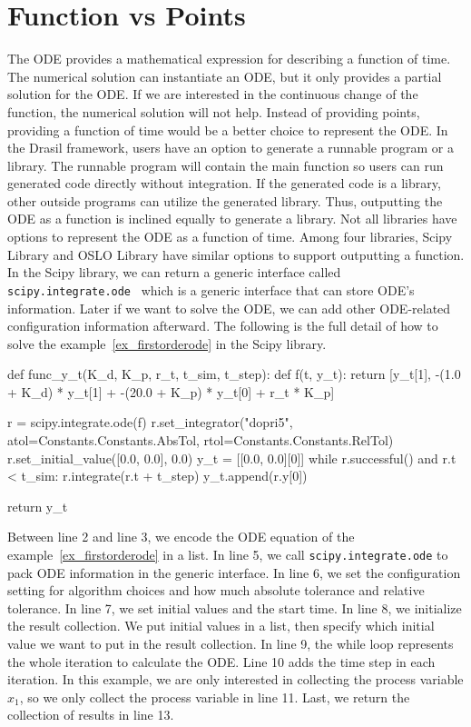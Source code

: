 \section{Function vs Points}
The ODE provides a mathematical expression for describing a function of time. The numerical solution can instantiate an ODE, but it only provides a partial solution for the ODE. If we are interested in the continuous change of the function, the numerical solution will not help. Instead of providing points, providing a function of time would be a better choice to represent the ODE. In the Drasil framework, users have an option to generate a runnable program or a library. The runnable program will contain the main function so users can run generated code directly without integration. If the generated code is a library, other outside programs can utilize the generated library. Thus, outputting the ODE as a function is inclined equally to generate a library. Not all libraries have options to represent the ODE as a function of time. Among four libraries, Scipy Library and OSLO Library have similar options to support outputting a function. In the Scipy library, we can return a generic interface called \verb|scipy.integrate.ode|~\citep{scipyfun} which is a generic interface that can store ODE's information. Later if we want to solve the ODE, we can add other ODE-related configuration information afterward. The following is the full detail of how to solve the example~\ref{ex_firstorderode} in the Scipy library.

\begin{listing}[ht]
\begin{python1}
def func_y_t(K_d, K_p, r_t, t_sim, t_step):
    def f(t, y_t):
        return [y_t[1], -(1.0 + K_d) * y_t[1] + -(20.0 + K_p) * y_t[0] + r_t * K_p]
    
    r = scipy.integrate.ode(f)
    r.set_integrator("dopri5", atol=Constants.Constants.AbsTol, rtol=Constants.Constants.RelTol)
    r.set_initial_value([0.0, 0.0], 0.0)
    y_t = [[0.0, 0.0][0]]
    while r.successful() and r.t < t_sim:
        r.integrate(r.t + t_step)
        y_t.append(r.y[0])
    
    return y_t
\end{python1}
\label{code_pythonscipy}
\end{listing}

Between line 2 and line 3, we encode the ODE equation of the example~\ref{ex_firstorderode} in a list. In line 5, we call \verb|scipy.integrate.ode| to pack ODE information in the generic interface. In line 6, we set the configuration setting for algorithm choices and how much absolute tolerance and relative tolerance. In line 7, we set initial values and the start time. In line 8, we initialize the result collection. We put initial values in a list, then specify which initial value we want to put in the result collection. In line 9, the while loop represents the whole iteration to calculate the ODE.  Line 10 adds the time step in each iteration. In this example, we are only interested in collecting the process variable $x_1$, so we only collect the process variable in line 11. Last, we return the collection of results in line 13.

